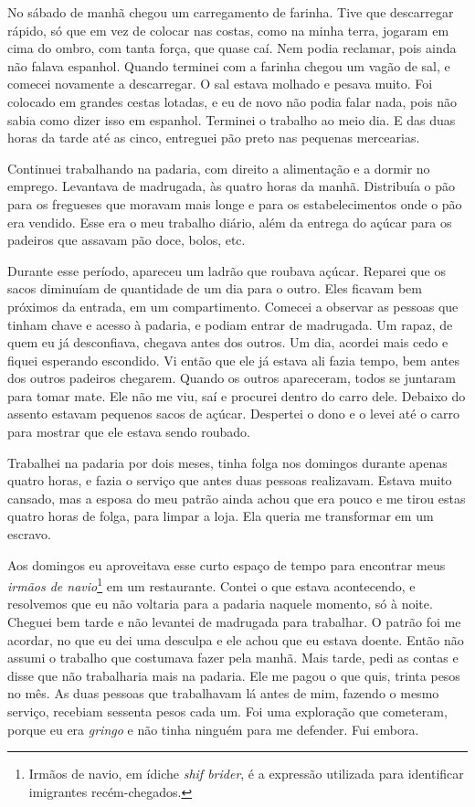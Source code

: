 No sábado de manhã chegou um carregamento de farinha. Tive que descarregar
rápido, só que em vez de colocar nas costas, como na minha terra,
jogaram em cima do ombro, com tanta força, que quase caí. Nem podia
reclamar, pois ainda não falava espanhol. Quando terminei com a farinha 
chegou um vagão de sal, e comecei novamente a
descarregar. O sal estava molhado e pesava muito. Foi colocado em
grandes cestas lotadas, e eu de novo não podia falar nada, pois não
sabia como dizer isso em espanhol. Terminei o trabalho ao meio dia. E das duas horas da tarde até as cinco, entreguei pão preto nas pequenas mercearias. 

Continuei trabalhando na padaria, com direito a
alimentação e a dormir no emprego. Levantava de madrugada, às quatro
horas da manhã. Distribuía o pão para os fregueses que moravam mais longe e para os
estabelecimentos onde o pão era vendido. Esse era o meu trabalho diário, 
além da entrega do açúcar para os padeiros que assavam pão doce,
bolos, etc.

Durante esse período, apareceu um ladrão que roubava açúcar. Reparei que os sacos diminuíam de quantidade de um dia para o outro. Eles ficavam bem próximos da entrada, em um compartimento. Comecei a observar as pessoas que tinham chave e acesso à padaria, e podiam entrar de madrugada. Um rapaz, de quem eu já desconfiava, chegava antes dos outros. Um dia, acordei mais cedo e fiquei esperando escondido. Vi então que ele já estava ali fazia tempo, bem antes dos outros padeiros chegarem. Quando os outros apareceram, todos se juntaram para tomar mate. Ele não me viu, saí e procurei dentro do carro dele. Debaixo do assento estavam pequenos sacos de açúcar. Despertei o dono e o levei até o carro para mostrar que ele estava sendo roubado.

Trabalhei na padaria por dois meses, tinha folga nos domingos durante apenas quatro
horas, e fazia o serviço que antes duas pessoas realizavam. Estava
muito cansado, mas a esposa do meu patrão ainda achou que era pouco e me 
tirou estas quatro horas de folga, para limpar a loja. Ela
queria me transformar em um escravo.

Aos domingos eu aproveitava esse curto espaço de tempo para encontrar 
meus \textit{irmãos de navio}\footnote{Irmãos de navio, em ídiche \textit{shif brider}, é a expressão utilizada para identificar imigrantes recém-chegados.} em um restaurante. Contei o que estava acontecendo, e resolvemos que eu não voltaria para a padaria naquele
momento, só à noite. Cheguei bem tarde e não levantei de madrugada para
trabalhar. O patrão foi me acordar, no que eu dei uma desculpa e ele
achou que eu estava doente. Então não assumi o trabalho que costumava fazer
pela manhã. Mais tarde, pedi as contas e disse que não trabalharia mais na
padaria. Ele me pagou o que quis, trinta pesos no mês. As duas pessoas que
trabalhavam lá antes de mim, fazendo o mesmo serviço, recebiam sessenta pesos cada um. Foi uma
exploração que cometeram, porque eu era \textit{gringo} e não tinha ninguém para me defender. Fui embora.

